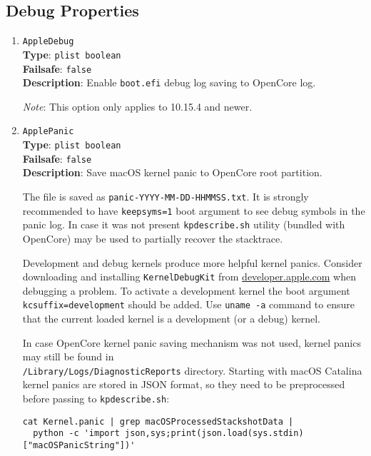 \documentclass[]{article}
\begin{document}
\subsection{Debug Properties}\label{miscdebugprops}

\begin{enumerate}

\item
  \texttt{AppleDebug}\\
  \textbf{Type}: \texttt{plist\ boolean}\\
  \textbf{Failsafe}: \texttt{false}\\
  \textbf{Description}: Enable \texttt{boot.efi} debug log saving to OpenCore log.

  \emph{Note}: This option only applies to 10.15.4 and newer.

\item
  \texttt{ApplePanic}\\
  \textbf{Type}: \texttt{plist\ boolean}\\
  \textbf{Failsafe}: \texttt{false}\\
  \textbf{Description}: Save macOS kernel panic to OpenCore root partition.

  The file is saved as \texttt{panic-YYYY-MM-DD-HHMMSS.txt}. It is strongly
  recommended to have \texttt{keepsyms=1} boot argument to see debug symbols
  in the panic log. In case it was not present \texttt{kpdescribe.sh} utility
  (bundled with OpenCore) may be used to partially recover the stacktrace.

  Development and debug kernels produce more helpful kernel panics.
  Consider downloading and installing \texttt{KernelDebugKit} from
  \href{https://developer.apple.com}{developer.apple.com} when debugging a problem.
  To activate a development kernel the boot argument \texttt{kcsuffix=development} should be added.
  Use \texttt{uname -a} command to ensure that the current loaded
  kernel is a development (or a debug) kernel.

  In case OpenCore kernel panic saving mechanism was not used, kernel panics may
  still be found in \\
  \texttt{/Library/Logs/DiagnosticReports} directory.
  Starting with macOS Catalina kernel panics are stored in JSON format, so they
  need to be preprocessed before passing to \texttt{kpdescribe.sh}:

\begin{lstlisting}[label=kpanic, style=ocbash]
cat Kernel.panic | grep macOSProcessedStackshotData |
  python -c 'import json,sys;print(json.load(sys.stdin)["macOSPanicString"])'
\end{lstlisting}


\end{enumerate}
\end{document}
